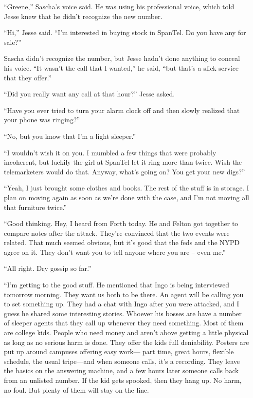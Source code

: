 \documentclass[12pt]{book}
\begin{document}
``Greene,'' Sascha's voice said.  He was using his professional voice, which told Jesse knew that he didn't recognize the new number.

``Hi,'' Jesse said.  ``I'm interested in buying stock in SpanTel.  Do you have any for sale?''

Sascha didn't recognize the number, but Jesse hadn't done anything to conceal his voice.  ``It wasn't the call that I wanted,'' he said, ``but that's a slick service that they offer.''

``Did you really want any call at that hour?'' Jesse asked.

``Have you ever tried to turn your alarm clock off and then slowly realized that your phone was ringing?''

``No, but you know that I'm a light sleeper.''

``I wouldn't wish it on you.  I mumbled a few things that were probably incoherent, but luckily the girl at SpanTel let it ring more than twice.  Wish the telemarketers would do that.  Anyway, what's going on?  You get your new digs?''

``Yeah, I just brought some clothes and books.  The rest of the stuff is in storage.  I plan on moving again as soon as we're done with the case, and I'm not moving all that furniture twice.''

``Good thinking.  Hey, I heard from Forth today.  He and Felton got together to compare notes after the attack.  They're convinced that the two events were related.  That much seemed obvious, but it's good that the feds and the NYPD agree on it.  They don't want you to tell anyone where you are -- even me.''

``All right.  Dry gossip so far.''

``I'm getting to the good stuff.  He mentioned that Ingo is being interviewed tomorrow morning.  They want us both to be there.  An agent will be calling you to set something up.  They had a chat with Ingo after you were attacked, and I guess he shared some interesting stories.  Whoever his bosses are have a number of sleeper agents that they call up whenever they need something.  Most of them are college kids.  People who need money and aren't above getting a little physical as long as no serious harm is done.  They offer the kids full deniability.  Posters are put up around campuses offering easy work--- part time, great hours, flexible schedule, the usual tripe---and when someone calls, it's a recording.  They leave the basics on the answering machine, and a few hours later someone calls back from an unlisted number.  If the kid gets spooked, then they hang up.  No harm, no foul.  But plenty of them will stay on the line.
\end{document}
